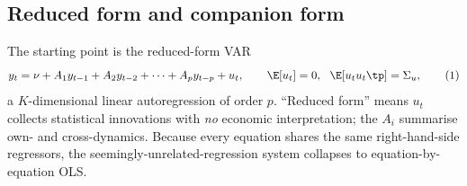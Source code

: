 
\subsection{Reduced form and companion form}\label{app:redcomp}
The starting point is the reduced-form VAR
\begin{equation}
y_t=\nu+A_1y_{t-1}+A_2y_{t-2}+\cdots+A_py_{t-p}+u_t,
\qquad \E[u_t]=0,\ \ \E[u_tu_t\tp]=\Sigma_u,
\tag{1}\label{aeq:red}
\end{equation}
a $K$-dimensional linear autoregression of order $p$. ``Reduced form'' means
$u_t$ collects statistical innovations with \emph{no} economic interpretation;
the $A_i$ summarise own- and cross-dynamics. Because every equation shares the
same right-hand-side regressors, the seemingly-unrelated-regression system
collapses to equation-by-equation OLS.

